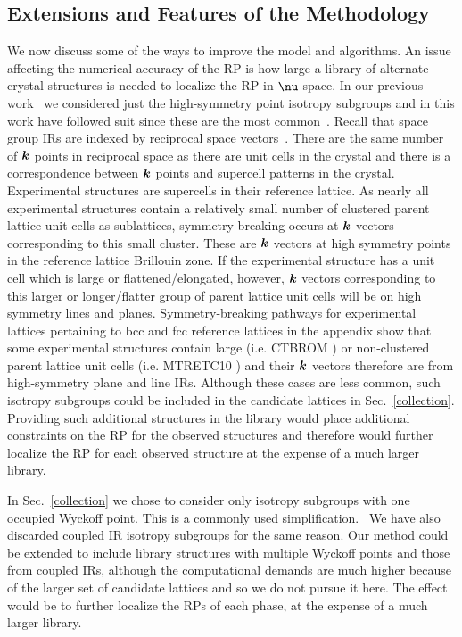 \documentclass[preprint]{iucr}              %
\newcommand{\mb}[1]{\ensuremath{\mbox{\boldmath $ #1 $}}}
\begin{document}
\subsection{Extensions and Features of the Methodology}
\label{extensions}

We now discuss some of the ways to improve the model and algorithms.
An issue affecting the numerical accuracy of the RP is how large a
library of alternate crystal structures is needed to localize the RP
in $\mb{\nu}$ space. In our previous work~\cite{Mettes04} we
considered just the high-symmetry point isotropy subgroups and in
this work have followed suit since these are the most
common~\cite{Stokes88}. Recall that space group IRs are indexed by
reciprocal space vectors~\cite{Kovalev93,Zak69}. There are the same
number of $\mb{k}$ points in reciprocal space as there are unit
cells in the crystal and there is a correspondence between $\mb{k}$
points and supercell patterns in the crystal. Experimental
structures are supercells in their reference lattice. As nearly all
experimental structures contain a relatively small number of
clustered parent lattice unit cells as sublattices,
symmetry-breaking occurs at $\mb{k}$ vectors corresponding to this
small cluster.  These are $\mb{k}$ vectors at high symmetry points
in the reference lattice Brillouin zone. If the experimental
structure has a unit cell which is large or flattened/elongated,
however, $\mb{k}$ vectors corresponding to this larger or
longer/flatter group of parent lattice unit cells will be on high
symmetry lines and planes. Symmetry-breaking pathways for experimental lattices
pertaining to bcc and fcc reference lattices in the appendix show that some experimental structures contain
large (i.e. CTBROM \cite{More77}) or non-clustered parent lattice unit cells (i.e. MTRETC10 \cite{Harrison72}) and their $\mb{k}$ vectors therefore are from high-symmetry
plane and line IRs. Although these cases are less common, such
isotropy subgroups could be included in the candidate lattices in
Sec.~\ref{collection}. Providing such additional structures in the
library would place additional constraints on the RP for the
observed structures and therefore would further localize the RP for each
observed structure at the expense of a much larger library.

In Sec.~\ref{collection} we chose to consider only isotropy
subgroups with one occupied Wyckoff point. This is a commonly used
simplification.~\cite{Verwer98} We have also discarded coupled IR
isotropy subgroups for the same reason. Our method could be extended
to include library structures with multiple Wyckoff points and those
from coupled IRs, although the computational demands are much higher
because of the larger set of candidate lattices and so we do not
pursue it here. The effect would be to further localize the RPs of
each phase, at the expense of a much larger library.
\end{document}
